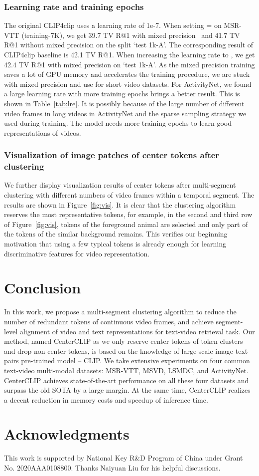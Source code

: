 \documentclass[sigconf]{acmart}
\begin{document}
\subsubsection{Learning rate and training epochs}
The original CLIP4clip uses a learning rate of 1e-7.
When setting  =  on MSR-VTT (\textsf{training-7K}), we get 39.7
TV R@1 with mixed precision~\cite{2018_AMP}
and 41.7 TV R@1 without mixed precision on the split `\textsf{test 1k-A}'.
The corresponding result of CLIP4clip baseline is 42.1 TV R@1.
When increasing the learning rate to , we get 
42.4 TV R@1 with mixed precision on `\textsf{test 1k-A}'.
As the mixed precision training saves a lot of GPU memory and
accelerates the training procedure,
we are stuck with mixed precision and 
use   for short video
datasets.
For ActivityNet, we found a large learning rate with more
training epochs brings a better result.
This is shown in Table~\ref{tab:lre}.
It is possibly because of the large number of different video frames in long videos in ActivityNet and the sparse sampling strategy we used during training.
The model needs more training epochs to 
learn good representations of videos.


\subsubsection{Visualization of image patches of center tokens after clustering}
We further display visualization results of center tokens
after multi-segment clustering with different numbers of video frames
within a temporal segment.
The results are shown in Figure~\ref{fig:vis}.
It is clear that the clustering algorithm reserves the most representative
tokens, for example, in the second and third row of Figure~\ref{fig:vis},
tokens of the foreground animal are selected and only part of the tokens of the similar background remains.
This verifies our beginning motivation that using a few typical tokens is already enough
for learning discriminative features for video representation.


\section{Conclusion}
In this work, we propose a multi-segment clustering algorithm to 
reduce the number of redundant tokens of continuous video frames,
and achieve segment-level alignment of video and text representations
for text-video retrieval task.
Our method, named CenterCLIP as we only reserve center tokens of token clusters
and drop non-center tokens,
is based on the knowledge of large-scale image-text pairs
pre-trained model -- CLIP.
We take extensive experiments on four common text-video multi-modal
datasets: MSR-VTT, MSVD, LSMDC, and ActivityNet.
CenterCLIP achieves state-of-the-art performance on all these four datasets
and surpass the old SOTA by a large margin.
At the same time, CenterCLIP realizes a decent reduction in memory costs and
speedup of inference time.


\section*{Acknowledgments}
This work is supported by National Key R\&D Program of China under Grant No. 2020AAA0108800.
Thanks Naiyuan Liu for his helpful discussions.



\newpage


\end{document}
